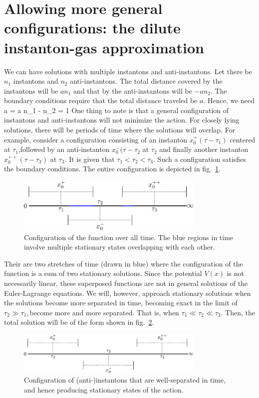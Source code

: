 \documentclass{article}
\begin{document}
\section{Allowing more general configurations: the dilute instanton-gas approximation}
We can have solutions with multiple instantons and anti-instantons. Let there be \(n_1\) instantons and \(n_2\) anti-instantons. The total distance covered by the instantons will be \(a n_1\) and that by the anti-instantons will be \(-a n_2\). The boundary conditions require that the total distance traveled be \(a\). Hence, we need 
\beq
 a  =  a \implies n_1 - n_2 = 1
\eeq
One thing to note is that a general configuration of instantons and anti-instantons will not minimize the action. For closely lying solutions, there will be periods of time where the solutions will overlap. For example, consider a configuration consisting of an instanton \(x_0^+(\tau - \tau_1)\) centered at \(\tau_1\),followed by an anti-instanton \(x_0^-(\tau - \tau_2\) at \(\tau_2\) and finally another instanton \(x_0^{++}(\tau - \tau_3)\) at \(\tau_3\). It is given that \(\tau_1 < \tau_2 < \tau_3\). Such a configuration satisfies the boundary conditions. The entire configuration is depicted in fig.~\ref{conf}.
\begin{figure}[htpb]
	\centering
	\includegraphics[width=0.8\textwidth]{./instantons.png}
	\caption{Configuration of the function over all time. The blue regions in time involve multiple stationary states overlapping with each other.}
	\label{conf}
\end{figure}
Their are two stretches of time (drawn in blue) where the configuration of the function is a sum of two stationary solutions. Since the potential \(V(x)\) is not necessarily linear, these superposed functions are not in general solutions of the Euler-Lagrange equations. We will, however, approach stationary solutions when the solutions become more separated in time, becoming exact in the limit of \(\tau_2 \gg \tau_1, \)become more and more separated. That is, when  \(\tau_1 \ll \tau_2 \ll \tau_3\). Then, the total solution will be of the form shown in fig.~\ref{conf2}.
\begin{figure}[htpb!]
	\centering
	\includegraphics[width=0.8\textwidth]{./instantons2.png}
	\caption{Configuration of (anti-)instantons that are well-separated in time, and hence producing stationary states of the action.}
	\label{conf2}
\end{figure}
\end{document}

